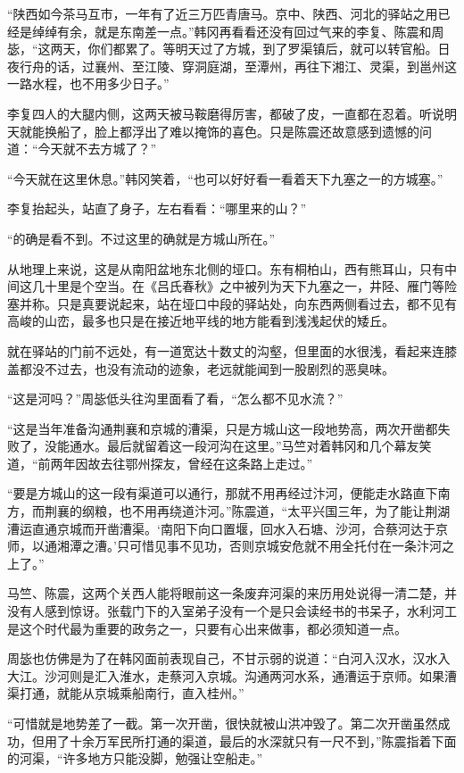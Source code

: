 “陕西如今茶马互市，一年有了近三万匹青唐马。京中、陕西、河北的驿站之用已经是绰绰有余，就是东南差一点。”韩冈再看看还没有回过气来的李复、陈震和周毖，“这两天，你们都累了。等明天过了方城，到了罗渠镇后，就可以转官船。日夜行舟的话，过襄州、至江陵、穿洞庭湖，至潭州，再往下湘江、灵渠，到邕州这一路水程，也不用多少日子。”

李复四人的大腿内侧，这两天被马鞍磨得厉害，都破了皮，一直都在忍着。听说明天就能换船了，脸上都浮出了难以掩饰的喜色。只是陈震还故意感到遗憾的问道：“今天就不去方城了？”

“今天就在这里休息。”韩冈笑着，“也可以好好看一看着天下九塞之一的方城塞。”

李复抬起头，站直了身子，左右看看：“哪里来的山？”

“的确是看不到。不过这里的确就是方城山所在。”

从地理上来说，这是从南阳盆地东北侧的垭口。东有桐柏山，西有熊耳山，只有中间这几十里是个空当。在《吕氏春秋》之中被列为天下九塞之一，井陉、雁门等险塞并称。只是真要说起来，站在垭口中段的驿站处，向东西两侧看过去，都不见有高峻的山峦，最多也只是在接近地平线的地方能看到浅浅起伏的矮丘。

就在驿站的门前不远处，有一道宽达十数丈的沟壑，但里面的水很浅，看起来连膝盖都没不过去，也没有流动的迹象，老远就能闻到一股剧烈的恶臭味。

“这是河吗？”周毖低头往沟里面看了看，“怎么都不见水流？”

“这是当年准备沟通荆襄和京城的漕渠，只是方城山这一段地势高，两次开凿都失败了，没能通水。最后就留着这一段河沟在这里。”马竺对着韩冈和几个幕友笑道，“前两年因故去往鄂州探友，曾经在这条路上走过。”

“要是方城山的这一段有渠道可以通行，那就不用再经过汴河，便能走水路直下南方，而荆襄的纲粮，也不用再绕道汴河。”陈震道，“太平兴国三年，为了能让荆湖漕运直通京城而开凿漕渠。‘南阳下向口置堰，回水入石塘、沙河，合蔡河达于京师，以通湘潭之漕。’只可惜见事不见功，否则京城安危就不用全托付在一条汴河之上了。”

马竺、陈震，这两个关西人能将眼前这一条废弃河渠的来历用处说得一清二楚，并没有人感到惊讶。张载门下的入室弟子没有一个是只会读经书的书呆子，水利河工是这个时代最为重要的政务之一，只要有心出来做事，都必须知道一点。

周毖也仿佛是为了在韩冈面前表现自己，不甘示弱的说道：“白河入汉水，汉水入大江。沙河则是汇入淮水，走蔡河入京城。沟通两河水系，通漕运于京师。如果漕渠打通，就能从京城乘船南行，直入桂州。”

“可惜就是地势差了一截。第一次开凿，很快就被山洪冲毁了。第二次开凿虽然成功，但用了十余万军民所打通的渠道，最后的水深就只有一尺不到，”陈震指着下面的河渠，“许多地方只能没脚，勉强让空船走。”

